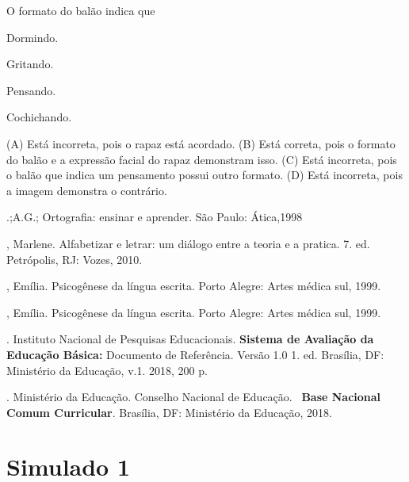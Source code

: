 O formato do balão indica que

\begin{minipage}{.5\textwidth}
\begin{escolha}
\item Dormindo.

\item Gritando.

\item Pensando.

\item Cochichando.
\end{escolha}
\end{minipage}

(A) Está incorreta, pois o rapaz está acordado.
(B) Está correta, pois o formato do balão e a expressão facial do rapaz
demonstram isso.
(C) Está incorreta, pois o balão que indica um pensamento possui outro formato.
(D) Está incorreta, pois a imagem demonstra o contrário.


\begin{bibliohedra}
.;A.G.; Ortografia: ensinar e aprender. São Paulo: Ática,1998

, Marlene. Alfabetizar e letrar: um diálogo entre a teoria e a
pratica. 7. ed. Petrópolis, RJ: Vozes, 2010.

, Emília. Psicogênese da língua escrita. Porto Alegre: Artes
médica sul, 1999.

, Emília. Psicogênese da língua escrita. Porto Alegre: Artes
médica sul, 1999.

. Instituto Nacional de Pesquisas Educacionais. \textbf{Sistema de
Avaliação da Educação Básica:} Documento de Referência. Versão 1.0 1.
ed. Brasília, DF: Ministério da Educação, v.1. 2018, 200 p.

. Ministério da Educação. Conselho Nacional de Educação.~
\textbf{Base Nacional Comum Curricular}. Brasília, DF: Ministério da
Educação, 2018.
\end{bibliohedra}

\chapter{Simulado 1}

